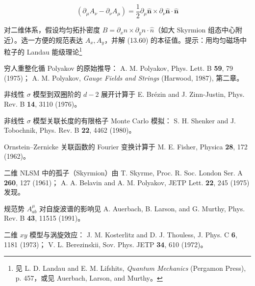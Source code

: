\begin{exercises}
\begin{equation*}
\left( \partial_ {\mu} A _ {\nu} - \partial_ {\nu} A _ {\mu} \right) = \frac {1}{2} \partial_ {\mu} \hat {\mathbf {n}} \times \partial_ {\nu} \hat {\mathbf {n}} \cdot \hat {\mathbf {n}}
\tag{13.61}
\end{equation*}

\item 对二维体系，假设均匀拓扑密度 $B = \partial_{x} \hat{n} \times \partial_{y} \hat{n} \cdot \hat{n}$（如大 Skyrmion 组态中心附近）。选一方便的规范表达 $A_{x}, A_{y}$，并解 (13.60) 的本征值。提示：用均匀磁场中粒子的 Landau 能级理论\footnote{见 L. D. Landau and E. M. Lifshits, \textit{Quantum Mechanics} (Pergamon Press), p. 457，或见 Auerbach, Larson, and Murthy。}

\end{exercises}

\begin{chapbib}
\item 穷人重整化循 Polyakov 的原始推导：
  A. M. Polyakov, Phys. Lett. B \textbf{59}, 79 (1975)；
  A. M. Polyakov, \textit{Gauge Fields and Strings} (Harwood, 1987), 第二章。
\item 非线性 {$\sigma$} 模型到双圈阶的 $d-2$ 展开计算于
  E. Brézin and J. Zinn-Justin, Phys. Rev. B \textbf{14}, 3110 (1976)。
\item 非线性 {$\sigma$} 模型关联长度的有限格子 Monte Carlo 模拟：
  S. H. Shenker and J. Tobochnik, Phys. Rev. B \textbf{22}, 4462 (1980)。
\item Ornstein--Zernicke 关联函数的 Fourier 变换计算于
  M. E. Fisher, Physica \textbf{28}, 172 (1962)。
\item 二维 NLSM 中的孤子（Skyrmion）由
  T. Skyrme, Proc. R. Soc. London Ser. A \textbf{260}, 127 (1961)；
  A. A. Belavin and A. M. Polyakov, JETP Lett. \textbf{22}, 245 (1975)
  发现。
\item 规范势 $A_{ab}^{\mu}$ 对自旋波谱的影响见
  A. Auerbach, B. Larson, and G. Murthy, Phys. Rev. B \textbf{43}, 11515 (1991)。
\item 二维 $xy$ 模型与涡旋效应：
  J. M. Kosterlitz and D. J. Thouless, J. Phys. C \textbf{6}, 1181 (1973)；
  V. L. Berezinskii, Sov. Phys. JETP \textbf{34}, 610 (1972)。
\end{chapbib}
